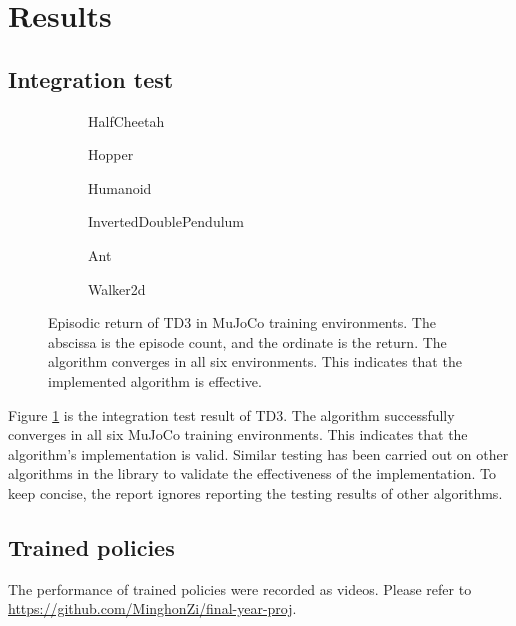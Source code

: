\newpage
\section{Results} \label{sec:results}

\subsection{Integration test}

\begin{figure}[htbp]
\centering
\begin{subfigure}[b]{0.49\textwidth}
   \centering
   
   \caption{HalfCheetah}
\end{subfigure}
\begin{subfigure}[b]{0.49\textwidth}
   \centering
   
   \caption{Hopper}
\end{subfigure}
\begin{subfigure}[b]{0.49\textwidth}
   \centering
   
   \caption{Humanoid}
\end{subfigure}
\begin{subfigure}[b]{0.49\textwidth}
   \centering
   
   \caption{InvertedDoublePendulum}
\end{subfigure}
\begin{subfigure}[b]{0.49\textwidth}
   \centering
   
   \caption{Ant}
\end{subfigure}
\begin{subfigure}[b]{0.49\textwidth}
   \centering
   
   \caption{Walker2d}
\end{subfigure}
\caption{Episodic return of TD3 in MuJoCo training environments. The abscissa is the episode count, and the ordinate is the return. The algorithm converges in all six environments. This indicates that the implemented algorithm is effective.}
\label{fig:td3_test}
\end{figure}

Figure \ref{fig:td3_test} is the integration test result of TD3. The algorithm successfully converges in all six MuJoCo training environments. This indicates that the algorithm's implementation is valid. Similar testing has been carried out on other algorithms in the library to validate the effectiveness of the implementation. To keep concise, the report ignores reporting the testing results of other algorithms.

\subsection{Trained policies}

The performance of trained policies were recorded as videos. Please refer to \url{https://github.com/MinghonZi/final-year-proj}.
